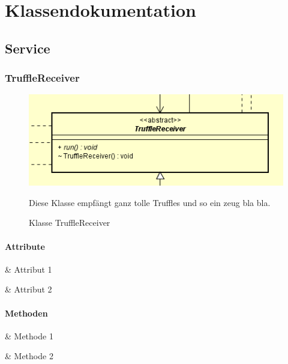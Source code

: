\chapter{Klassendokumentation}

\section{Service}

\subsection{TruffleReceiver}

\begin{figure}[h!]
    \centering
    \includegraphics[width=\textwidth]{../diagramimages/TruffleReceiver.png}
    \caption[Klasse TruffleReceiver]{Klasse TruffleReceiver}
    \medskip
    Diese Klasse empfängt ganz tolle Truffles und so ein zeug bla bla.
\end{figure}

\subsubsection*{Attribute}

\begin{easylist}[itemize]

    & Attribut 1

    & Attribut 2

\end{easylist}

\subsubsection*{Methoden}

\begin{easylist}[itemize]

    & Methode 1

    & Methode 2

\end{easylist} 